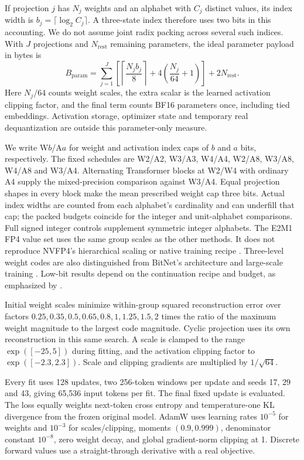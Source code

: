 \documentclass[11pt]{article}
\begin{document}
If projection \(j\) has \(N_j\) weights and an alphabet with \(C_j\)
distinct values, its index width is \(b_j=\lceil\log_2 C_j\rceil\).
A three-state index therefore uses two bits in this accounting. We do not
assume joint radix packing across several such indices.
With \(J\) projections and \(N_{\mathrm{rest}}\) remaining parameters,
the ideal parameter payload in bytes is
\begin{equation}
 B_{\mathrm{param}}=
 \sum_{j=1}^{J}\left[
    \left\lceil\frac{N_jb_j}{8}\right\rceil+
    4\left(\frac{N_j}{64}+1\right)
 \right]+2N_{\mathrm{rest}}.
\end{equation}
Here \(N_j/64\) counts weight scales, the extra scalar is the learned
activation clipping factor, and the final term counts BF16 parameters once,
including tied embeddings. Activation storage, optimizer state and temporary
real dequantization are outside this parameter-only measure.


We write W\(b\)/A\(a\) for weight and activation index caps of \(b\)
and \(a\) bits, respectively. The fixed schedules are W2/A2, W3/A3, W4/A4, W2/A8, W3/A8, W4/A8 and
W3/A4. Alternating Transformer blocks at W2/W4 with ordinary A4 supply the
mixed-precision comparison against W3/A4. Equal projection shapes in every
block make the mean prescribed weight cap three bits. Actual index widths
are counted from each alphabet's cardinality and can underfill that cap;
the packed budgets coincide for the integer and unit-alphabet comparisons. Full signed integer
controls supplement symmetric integer alphabets. The E2M1 FP4 value set
uses the same group scales as the other methods. It does not reproduce
NVFP4's hierarchical scaling or native training recipe
\citep{nvidia2026nvfp4}. Three-level weight codes are also distinguished
from BitNet's architecture and large-scale training
\citep{ma2024era,ma2025bitnet}. Low-bit results depend on the continuation
recipe and budget, as emphasized by \citet{liu2025paretoq}.

Initial weight scales minimize within-group squared reconstruction error
over factors $0.25,0.35,0.5,0.65,0.8,1,1.25,1.5,2$ times the ratio of
the maximum weight magnitude to the largest code magnitude. Cyclic
projection uses its own reconstruction in this same search. A scale is
clamped to the range $\exp([-25,5])$ during fitting, and the activation
clipping factor to $\exp([-2.3,2.3])$. Scale and clipping gradients are
multiplied by $1/\sqrt{64}$.

Every fit uses 128 updates, two 256-token windows per update and seeds
17, 29 and 43, giving 65,536 input tokens per fit. The final fixed update
is evaluated. The loss equally weights next-token cross entropy and
temperature-one KL divergence from the frozen original model. AdamW uses
learning rates \(10^{-5}\) for weights and \(10^{-3}\) for scales/clipping,
moments \((0.9,0.999)\), denominator constant \(10^{-8}\), zero weight decay,
and global gradient-norm clipping at 1. Discrete forward values use a
straight-through derivative with a real objective.
\end{document}
